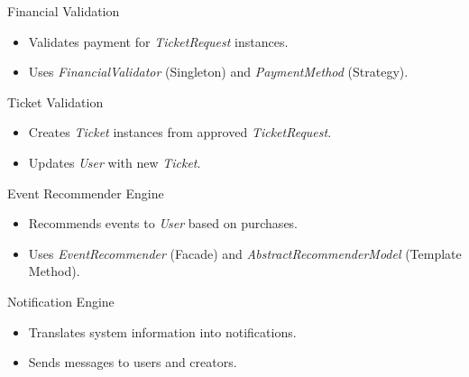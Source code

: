 \documentclass{beamer}
\begin{document}
\begin{frame}{Financial Validation}
    \begin{itemize}
        \item Validates payment for \textit{TicketRequest} instances.
        \item Uses \textit{FinancialValidator} (Singleton) and \textit{PaymentMethod} (Strategy).
    \end{itemize}
\end{frame}

\begin{frame}{Ticket Validation}
    \begin{itemize}
        \item Creates \textit{Ticket} instances from approved \textit{TicketRequest}.
        \item Updates \textit{User} with new \textit{Ticket}.
    \end{itemize}
\end{frame}

\begin{frame}{Event Recommender Engine}
    \begin{itemize}
        \item Recommends events to \textit{User} based on purchases.
        \item Uses \textit{EventRecommender} (Facade) and \textit{AbstractRecommenderModel} (Template Method).
    \end{itemize}
\end{frame}

\begin{frame}{Notification Engine}
    \begin{itemize}
        \item Translates system information into notifications.
        \item Sends messages to users and creators.
    \end{itemize}
\end{frame}
\end{document}
